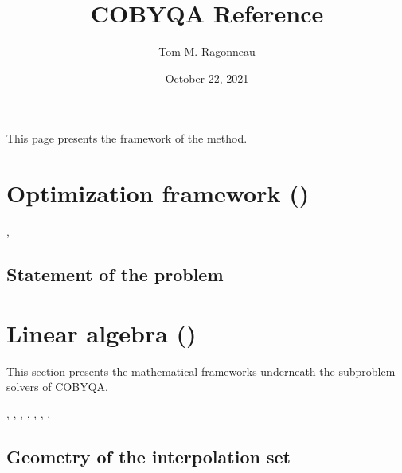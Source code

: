 \documentclass[letterpaper,10pt,english]{sphinxmanual}
\title{COBYQA Reference}
\date{October 22, 2021}
\author{Tom M. Ragonneau}
\begin{document}
\pagestyle{empty}
\sphinxmaketitle
\pagestyle{plain}
\sphinxtableofcontents
\pagestyle{normal}
\label{\detokenize{algo/index::doc}}


\sphinxAtStartPar
This page presents the framework of the method.


\chapter{Optimization framework ()}
\label{\detokenize{algo/optimize:optimization-framework-cobyqa}}\label{\detokenize{algo/optimize:optimize}}\label{\detokenize{algo/optimize::doc}}

\nopagebreak


\sphinxAtStartPar
{},




\section{Statement of the problem}
\label{\detokenize{algo/optimize:statement-of-the-problem}}

\chapter{Linear algebra ()}
\label{\detokenize{algo/linalg:linear-algebra-cobyqa-linalg}}\label{\detokenize{algo/linalg:linalg}}\label{\detokenize{algo/linalg::doc}}
\sphinxAtStartPar
This section presents the mathematical frameworks underneath the subproblem
solvers of COBYQA.


\nopagebreak


\sphinxAtStartPar
{},
,
,
,
,
,
,




\section{Geometry of the interpolation set}
\label{\detokenize{algo/linalg.altmov:geometry-of-the-interpolation-set}}\label{\detokenize{algo/linalg.altmov:linalg-altmov}}\label{\detokenize{algo/linalg.altmov::doc}}
\end{document}
